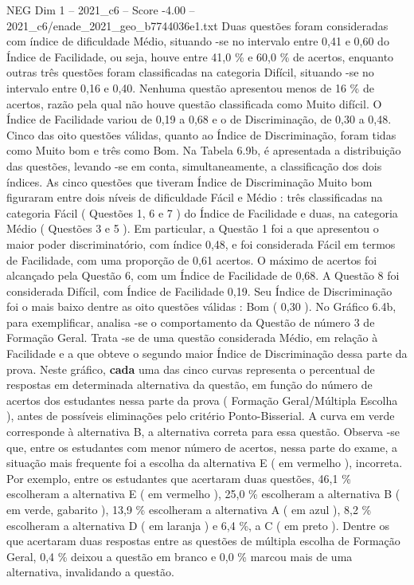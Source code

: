 \begin{textsample}{NEG Dim 1 – 2021\_c6 – Score -4.00 – 2021\_c6/enade\_2021\_geo\_b7744036e1.txt}
Duas questões foram consideradas com índice de dificuldade Médio, situando -se no intervalo entre 0,41 e 0,60 do Índice de Facilidade, ou seja, houve entre 41,0 \% e 60,0 \% de acertos, enquanto outras três questões foram classificadas na categoria Difícil, situando -se no intervalo entre 0,16 e 0,40.
Nenhuma questão apresentou menos de 16 \% de acertos, razão pela qual não houve questão classificada como Muito difícil.
O Índice de Facilidade variou de 0,19 a 0,68 e o de Discriminação, de 0,30 a 0,48.
Cinco das oito questões válidas, quanto ao Índice de Discriminação, foram tidas como Muito bom e três como Bom.
Na Tabela 6.9b, é apresentada a distribuição das questões, levando -se em conta, simultaneamente, a classificação dos dois índices.
As cinco questões que tiveram Índice de Discriminação Muito bom figuraram entre dois níveis de dificuldade Fácil e Médio : três classificadas na categoria Fácil ( Questões 1, 6 e 7 ) do Índice de Facilidade e duas, na categoria Médio ( Questões 3 e 5 ).
Em particular, a Questão 1 foi a que apresentou o maior poder discriminatório, com índice 0,48, e foi considerada Fácil em termos de Facilidade, com uma proporção de 0,61 acertos.
O máximo de acertos foi alcançado pela Questão 6, com um Índice de Facilidade de 0,68.
A Questão 8 foi considerada Difícil, com Índice de Facilidade 0,19.
Seu Índice de Discriminação foi o mais baixo dentre as oito questões válidas : Bom ( 0,30 ).
No Gráfico 6.4b, para exemplificar, analisa -se o comportamento da Questão de número 3 de Formação Geral.
Trata -se de uma questão considerada Médio, em relação à Facilidade e a que obteve o segundo maior Índice de Discriminação dessa parte da prova.
Neste gráfico, \textbf{cada} uma das cinco curvas representa o percentual de respostas em determinada alternativa da questão, em função do número de acertos dos estudantes nessa parte da prova ( Formação Geral/Múltipla Escolha ), antes de possíveis eliminações pelo critério Ponto-Bisserial.
A curva em verde corresponde à alternativa B, a alternativa correta para essa questão.
Observa -se que, entre os estudantes com menor número de acertos, nessa parte do exame, a situação mais frequente foi a escolha da alternativa E ( em vermelho ), incorreta.
Por exemplo, entre os estudantes que acertaram duas questões, 46,1 \% escolheram a alternativa E ( em vermelho ), 25,0 \% escolheram a alternativa B ( em verde, gabarito ), 13,9 \% escolheram a alternativa A ( em azul ), 8,2 \% escolheram a alternativa D ( em laranja ) e 6,4 \%, a C ( em preto ).
Dentre os que acertaram duas respostas entre as questões de múltipla escolha de Formação Geral, 0,4 \% deixou a questão em branco e 0,0 \% marcou mais de uma alternativa, invalidando a questão.

\end{textsample}
